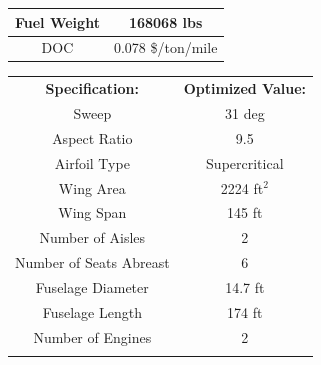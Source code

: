 \documentclass{article}
\begin{document}
\begin{table}[ht]
\begin{tabular}{|c|c|}
                Fuel Weight                        & 168068 lbs                           \\ \hline
                \rowcolor[HTML]{C0C0C0}
                DOC                                & 0.078 \$/ton/mile                   \\ \hline
            \end{tabular}
            \quad
            \begin{tabular}{|c|c|}
                \hline
                \rowcolor[HTML]{DAE8FC}
                \multicolumn{2}{|c|}{\cellcolor[HTML]{DAE8FC}\textbf{One-stop Aircraft}} \\ \hline
                \textbf{Specification:}            & \textbf{Optimized Value:}           \\ \hline
                Sweep                              & 31 deg                              \\ \hline
                \rowcolor[HTML]{C0C0C0}
                Aspect Ratio                       & 9.5                                 \\ \hline
                \rowcolor[HTML]{FFFFFF}
                Airfoil Type                       & Supercritical                       \\ \hline
                \rowcolor[HTML]{C0C0C0}
                Wing Area                          & 2224 ft$^2$                             \\ \hline
                \rowcolor[HTML]{FFFFFF}
                Wing Span                          & 145 ft                              \\ \hline
                \rowcolor[HTML]{C0C0C0}
                Number of Aisles                   & 2                                   \\ \hline
                \rowcolor[HTML]{FFFFFF}
                Number of Seats Abreast            & 6                                   \\ \hline
                \rowcolor[HTML]{C0C0C0}
                Fuselage Diameter                  & 14.7 ft                             \\ \hline
                \rowcolor[HTML]{FFFFFF}
                Fuselage Length                    & 174 ft                              \\ \hline
                \rowcolor[HTML]{C0C0C0}
                Number of Engines                  & 2                                   \\ \hline
                \rowcolor[HTML]{FFFFFF}

\end{tabular}
\end{table}
\end{document}
